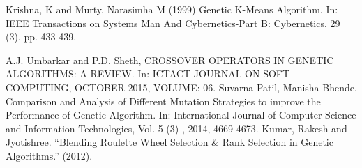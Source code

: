 \documentclass[10pt]{article}
\begin{document}
\begin{thebibliography}{9}
Krishna, K and Murty, Narasimha M (1999) Genetic K-Means Algorithm. In: IEEE Transactions on Systems Man And Cybernetics-Part B: Cybernetics, 29 (3). pp. 433-439.

A.J. Umbarkar and P.D. Sheth, CROSSOVER OPERATORS IN GENETIC ALGORITHMS: A REVIEW. In: ICTACT JOURNAL ON SOFT COMPUTING, OCTOBER 2015, VOLUME: 06.
Suvarna Patil, Manisha Bhende, Comparison and Analysis of Different Mutation Strategies to improve the Performance of Genetic Algorithm. In:  International Journal of Computer Science and Information Technologies, Vol. 5 (3) , 2014, 4669-4673.
Kumar, Rakesh and Jyotishree. “Blending Roulette Wheel Selection \& Rank Selection in Genetic Algorithms.” (2012).
\end{thebibliography}
\end{document}
